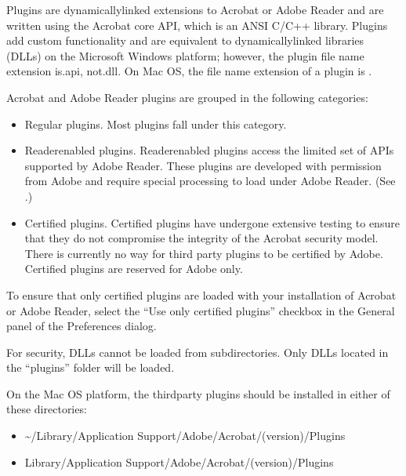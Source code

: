 \documentclass[letterpaper,12pt,english,openany,oneside]{sphinxmanual}
\begin{document}
Plugins are dynamically\sphinxhyphen{}linked extensions to Acrobat or Adobe Reader and are written using the Acrobat core API, which is an ANSI C/C++ library. Plugins add custom functionality and are equivalent to dynamically\sphinxhyphen{}linked libraries (DLLs) on the Microsoft Windows platform; however, the plugin file name extension is.api, not.dll. On Mac OS, the file name extension of a plugin is .

Acrobat and Adobe Reader plugins are grouped in the following categories:
\begin{itemize}
\item {} 
Regular plugins. Most plugins fall under this category.

\item {} 
Reader\sphinxhyphen{}enabled plugins. Reader\sphinxhyphen{}enabled plugins access the limited set of APIs supported by Adobe Reader. These plugins are developed with permission from Adobe and require special processing to load under Adobe Reader. (See .)

\item {} 
Certified plugins. Certified plugins have undergone extensive testing to ensure that they do not compromise the integrity of the Acrobat security model. There is currently no way for third party plugins to be certified by Adobe. Certified plugins are reserved for Adobe only.

\end{itemize}

To ensure that only certified plugins are loaded with your installation of Acrobat or Adobe Reader, select the “Use only certified plugins” checkbox in the General panel of the Preferences dialog.

For security, DLLs cannot be loaded from subdirectories. Only DLLs located in the “plugins” folder will be loaded.

On the Mac OS platform, the third\sphinxhyphen{}party plugins should be installed in either of these directories:
\begin{itemize}
\item {} 
\textasciitilde{}/Library/Application Support/Adobe/Acrobat/(version)/Plugins

\item {} 
Library/Application Support/Adobe/Acrobat/(version)/Plugins

\end{itemize}
\end{document}
